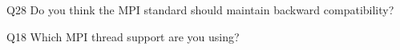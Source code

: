 \begin{description}%
\item{Q28} Do you think the MPI standard should maintain backward compatibility?%
\item{Q18} Which MPI thread support are you using?%
\end{description}%
